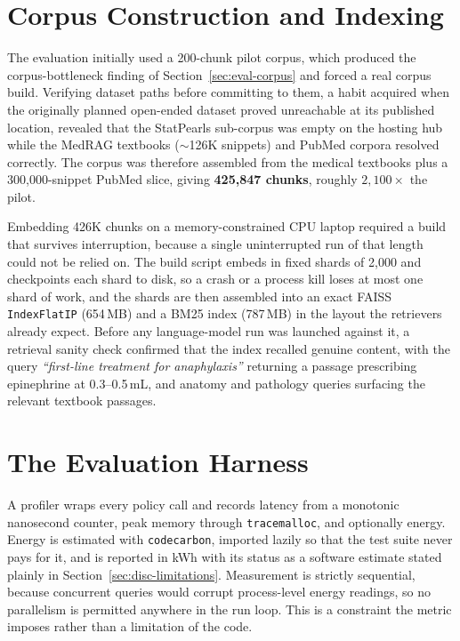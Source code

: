 \section{Corpus Construction and Indexing}
\label{sec:impl-corpus}

The evaluation initially used a 200-chunk pilot corpus, which produced the
corpus-bottleneck finding of Section~\ref{sec:eval-corpus} and forced a real
corpus build. Verifying dataset paths before committing to them, a habit
acquired when the originally planned open-ended dataset proved unreachable at
its published location, revealed that the StatPearls sub-corpus was empty on
the hosting hub while the MedRAG textbooks ($\sim$126K snippets) and PubMed
corpora resolved correctly. The corpus was therefore assembled from the
medical textbooks plus a 300,000-snippet PubMed slice, giving
\textbf{425,847 chunks}, roughly $2{,}100\times$ the pilot.

Embedding 426K chunks on a memory-constrained CPU laptop required a build that
survives interruption, because a single uninterrupted run of that length could
not be relied on. The build script embeds in fixed shards of 2,000 and
checkpoints each shard to disk, so a crash or a process kill loses at most one
shard of work, and the shards are then assembled into an exact FAISS
\texttt{IndexFlatIP} (654\,MB) and a BM25 index (787\,MB) in the layout the
retrievers already expect. Before any language-model run was launched against
it, a retrieval sanity check confirmed that the index recalled genuine
content, with the query \emph{``first-line treatment for anaphylaxis''}
returning a passage prescribing epinephrine at 0.3--0.5\,mL, and anatomy and
pathology queries surfacing the relevant textbook passages.

\section{The Evaluation Harness}
\label{sec:impl-harness}

A profiler wraps every policy call and records latency from a monotonic
nanosecond counter, peak memory through \texttt{tracemalloc}, and optionally
energy. Energy is estimated with \texttt{codecarbon}, imported lazily so that
the test suite never pays for it, and is reported in kWh with its status as a
software estimate stated plainly in Section~\ref{sec:disc-limitations}.
Measurement is strictly sequential, because concurrent queries would corrupt
process-level energy readings, so no parallelism is permitted anywhere in the
run loop. This is a constraint the metric imposes rather than a limitation of
the code.

